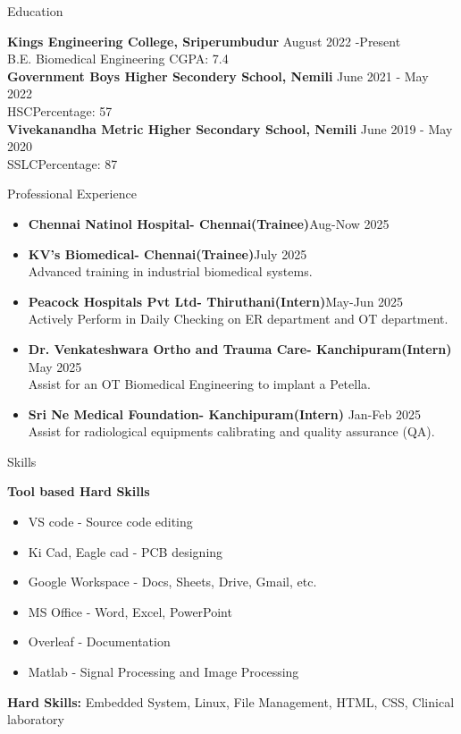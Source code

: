 \documentclass{resume}
\begin{document}
\begin{rSection}{Education}


{\bf Kings Engineering College, Sriperumbudur} \hfill{August 2022 -Present} \\{B.E. Biomedical Engineering} \hfill{CGPA: 7.4} \\{\bf Government Boys Higher Secondery School, Nemili} \hfill {June 2021 - May 2022} \\{HSC}\hfill {Percentage: 57 }\\{\bf Vivekanandha Metric Higher Secondary School, Nemili} \hfill {June 2019 - May 2020} \\{SSLC}\hfill {Percentage: 87 }


\begin{rSection}{Professional Experience}
\begin{itemize}
\item {\bf Chennai Natinol Hospital- Chennai(Trainee)}\hfill{Aug-Now 2025}\\

\item {\bf KV's Biomedical- Chennai(Trainee)}\hfill{July 2025}\\
Advanced training in industrial biomedical systems.
\item {\bf Peacock Hospitals Pvt Ltd- Thiruthani(Intern)}\hfill{May-Jun 2025}\\
 Actively Perform in Daily Checking on ER department and OT department.
\item{\bf Dr. Venkateshwara Ortho and Trauma Care- Kanchipuram(Intern)}\hfill{ May 2025}\\
  Assist for an OT Biomedical Engineering to implant a Petella.
  \item{\bf Sri Ne Medical Foundation- Kanchipuram(Intern)}\hfill{ Jan-Feb 2025}\\
  Assist for radiological equipments calibrating and quality assurance (QA).
\end{itemize}
\end{rSection}

\begin{rSection}{Skills}

{\bf Tool based Hard Skills} \begin{itemize}
    \item VS code - Source code editing 
     \item Ki Cad, Eagle cad - PCB designing
     \item Google Workspace - Docs, Sheets, Drive, Gmail, etc. 
    \item MS Office - Word, Excel, PowerPoint
    \item Overleaf - Documentation
    \item Matlab - Signal Processing and Image Processing
\end{itemize} 
\vspace{0.5cm}
{\bf Hard Skills:} Embedded System, Linux, File Management, HTML, CSS, Clinical laboratory\\


\end{rSection}
\end{rSection}
\end{document}
